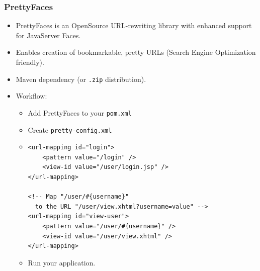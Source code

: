 \documentclass[10pt,xcolor=pdflatex]{beamer}
\begin{document}
\begin{frame}[containsverbatim]\frametitle{PrettyFaces}
  \begin{itemize}
    \item PrettyFaces is an OpenSource URL-rewriting library with enhanced support for JavaServer Faces.
    \item Enables creation of bookmarkable, pretty URLs (Search Engine Optimization friendly).
    \item Maven dependency (or \texttt{.zip} distribution).
    \item Workflow:
      \begin{itemize}
        \item Add PrettyFaces to your \texttt{pom.xml}
        \item Create \texttt{pretty-config.xml}
        \item[] \begin{footnotesize}
          \begin{verbatim}
<url-mapping id="login">
    <pattern value="/login" />
    <view-id value="/user/login.jsp" />
</url-mapping>

<!-- Map "/user/#{username}" 
  to the URL "/user/view.xhtml?username=value" -->
<url-mapping id="view-user">
    <pattern value="/user/#{username}" />
    <view-id value="/user/view.xhtml" />
</url-mapping>
\end{verbatim}
          \end{footnotesize}
        \item Run your application.
      \end{itemize}
  \end{itemize}
\end{frame}
\end{document}
